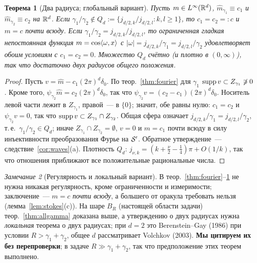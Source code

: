 \documentclass[11pt,a4paper]{article}
\numberwithin{equation}{section}
\newtheorem{theorem}{Теорема}[section]
\theoremstyle{definition}
\theoremstyle{remark}
\newtheorem{remark}[theorem]{Замечание}
\begin{document}
\begin{theorem}[Два радиуса; глобальный вариант]\label{thm:tworadii}
Пусть $m\in L^\infty(\mathbb R^d)$, $\hat m_{\gamma_1}\equiv c_1$ и $\hat m_{\gamma_2}\equiv c_2$ на $\mathbb R^d$. Если $\gamma_1/\gamma_2\notin Q_d:=\{j_{d/2,k}/j_{d/2,l}:k,l\ge1\}$, то $c_1=c_2=:c$ и $m=c$ почти всюду. Если $\gamma_1/\gamma_2=j_{d/2,k}/j_{d/2,l}$, то ограниченная гладкая непостоянная функция $m=\cos\langle \omega,x\rangle$ с $|\omega|=j_{d/2,k}/\gamma_1=j_{d/2,l}/\gamma_2$ удовлетворяет обоим условиям с $c_1=c_2=0$. Множество $Q_d$ счётно (и плотно в $(0,\infty)$), так что достаточно двух радиусов общего положения.
\end{theorem}
\begin{proof}
Пусть $v=\hat m-c_1(2\pi)^d\delta_0$. По теор.~\ref{thm:fourier} для $\gamma_1$ $\operatorname{supp} v\subset Z_{\gamma_1}\not\ni0$. Кроме того, $\psi_{\gamma_2}\hat m=c_2(2\pi)^d\delta_0$, так что $\psi_{\gamma_2}v=(c_2-c_1)(2\pi)^d\delta_0$. Носитель левой части лежит в $Z_{\gamma_1}$, правой~--- в $\{0\}$; значит, обе равны нулю: $c_1=c_2$ и $\psi_{\gamma_2}v=0$, так что $\operatorname{supp} v\subset Z_{\gamma_1}\cap Z_{\gamma_2}$. Общая сфера означает $j_{d/2,k}/\gamma_1=j_{d/2,l}/\gamma_2$, т.\,е.\ $\gamma_1/\gamma_2\in Q_d$; иначе $Z_{\gamma_1}\cap Z_{\gamma_2}=\emptyset$, $v=0$ и $m=c_1$ почти всюду в силу инъективности преобразования Фурье на $\mathcal S'$. Обратное утверждение~--- следствие~\ref{cor:waves}(a). Плотность $Q_d$: $j_{\nu,k}=(k+\frac\nu2-\frac14)\pi+O(1/k)$, так что отношения приближают все положительные рациональные числа.
\end{proof}

\begin{remark}[Регулярность и локальный вариант]
В теор.~\ref{thm:fourier}--\ref{thm:tworadii} не нужна никакая регулярность, кроме ограниченности и измеримости; заключение~--- $m=c$ \emph{почти всюду}, а большего от оракула требовать нельзя (лемма~\ref{lem:stokes}(c)). На шаре $B_R$ (настоящей области задачи) теор.~\ref{thm:allgamma} доказана выше, а утверждению о двух радиусах нужна \emph{локальная} теорема о двух радиусах; при $d=2$ это Berenstein--Gay (1986) при условии $R>\gamma_1+\gamma_2$, общее $d$ рассматривает Volchkov (2003). \textbf{Мы цитируем их без перепроверки}; в задаче $R\gg\gamma_1+\gamma_2$, так что предположение этих теорем выполнено.
\end{remark}
\end{document}
